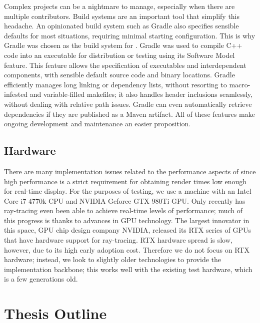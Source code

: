 
Complex projects can be a nightmare to manage, especially when there are multiple contributors.
Build systems are an important tool that simplify this headache.
An opinionated build system such as Gradle also specifies sensible defaults for most situations, requiring minimal starting configuration.
This is why Gradle was chosen as the build system for \name.
Gradle was used to compile C++ code into an executable for distribution or testing using its Software Model feature.
This feature allows the specification of executables and interdependent components, with sensible default source code and binary locations.
Gradle efficiently manages long linking or dependency lists, without resorting to macro-infested and variable-filled makefiles; it also handles header inclusions seamlessly, without dealing with relative path issues.
Gradle can even automatically retrieve dependencies if they are published as a Maven artifact.
All of these features make ongoing development and maintenance an easier proposition.

\subsection{Hardware}
\label{ch:intro:background:hardware}

There are many implementation issues related to the performance aspects of \name since high performance is a strict requirement for obtaining render times low enough for real-time display.
For the purposes of testing, we use a machine with an Intel Core i7 4770k CPU and NVIDIA Geforce GTX 980Ti GPU.
Only recently has ray-tracing even been able to achieve real-time levels of performance; much of this progress is thanks to advances in GPU technology.
The largest innovator in this space, GPU chip design company NVIDIA, released its RTX series of GPUs that have hardware support for ray-tracing.
RTX hardware spread is slow, however, due to its high early adoption cost.
Therefore we do not focus on RTX hardware; instead, we look to slightly older technologies to provide the implementation backbone; this works well with the existing test hardware, which is a few generations old.


\section{Thesis Outline}
\label{ch:intro:outline}

